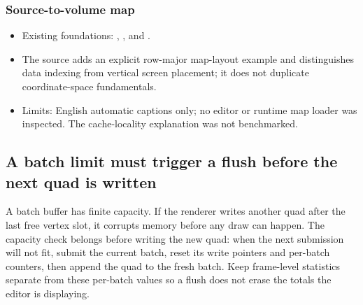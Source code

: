 \subsubsection{Source-to-volume map}\label{06-engine-ii-ch026-source-to-volume-map-2}

\hypertarget{06-engine-ii-ch026-source-to-volume-map-2}{}

\begin{itemize}
\tightlist
\item
  Existing foundations: , , and .
\item
  The source adds an explicit row-major map-layout example and distinguishes data indexing from vertical screen placement; it does not duplicate coordinate-space fundamentals.
\item
  Limits: English automatic captions only; no editor or runtime map loader was inspected. The cache-locality explanation was not benchmarked.
\end{itemize}

\subsection{A batch limit must trigger a flush before the next quad is written}\label{06-engine-ii-ch026-a-batch-limit-must-trigger-a-flush-before-the-next-quad-is-written}

\hypertarget{06-engine-ii-ch026-a-batch-limit-must-trigger-a-flush-before-the-next-quad-is-written}{}

A batch buffer has finite capacity. If the renderer writes another quad after the last free vertex slot, it corrupts memory before any draw can happen. The capacity check belongs before writing the new quad: when the next submission will not fit, submit the current batch, reset its write pointers and per-batch counters, then append the quad to the fresh batch. Keep frame-level statistics separate from these per-batch values so a flush does not erase the totals the editor is displaying.

